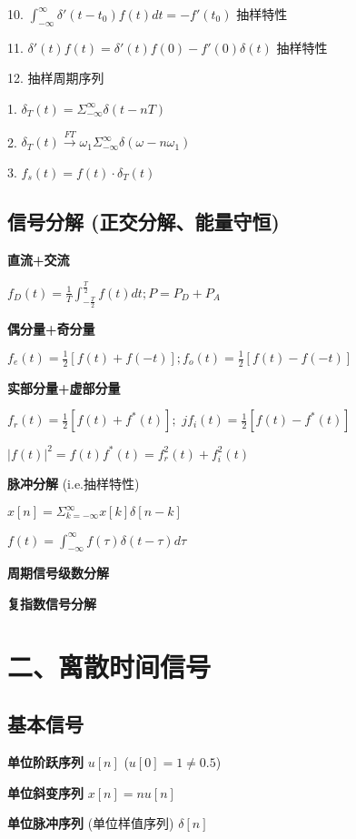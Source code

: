 10. $\int ^{\infty} _{-\infty} \delta' (t-t_0)f(t)dt = -f'(t_0)$ 抽样特性

11. $\delta '(t)f(t) = \delta'(t)f(0) - f'(0)\delta(t)$ 抽样特性

12. 抽样周期序列
    
    1. $\delta_T(t) = \Sigma ^{\infty} _ {-\infty} \delta(t - nT)$
    
    2. $\delta_T(t) \xrightarrow{FT} \omega_1\Sigma ^{\infty} _ {-\infty} \delta(\omega - n\omega _1)$
    
    3. $f_s(t) = f(t) \cdot \delta_T(t)$

\subsection*{信号分解 (正交分解、能量守恒)}

\textbf{直流+交流}

$f_D(t) = \frac{1}{T}\int ^{\frac{T}{2}} _{-\frac{T}{2}} f(t)dt ; P = P_D + P_A$

\textbf{偶分量+奇分量}

$f_e(t)=\frac{1}{2}[f(t)+f(-t)];f_o(t)=\frac{1}{2}[f(t)-f(-t)]$

\textbf{实部分量+虚部分量}

$f_r(t)=\frac{1}{2}[f(t)+f^*(t)];$   $jf_i(t)=\frac{1}{2}[f(t)-f^*(t)]$

$|f(t)|^2 = f(t)f^*(t)=f_r^2(t)+f_i^2(t)$

\textbf{脉冲分解} (i.e.抽样特性)

$x[n] = \Sigma ^{\infty} _{k=- \infty} x[k]\delta[n-k]$

$f(t) = \int ^{\infty} _{-\infty} f(\tau)\delta(t-\tau)d\tau$

\textbf{周期信号级数分解}

\textbf{复指数信号分解}

\section*{二、离散时间信号}

\subsection*{基本信号}

\textbf{单位阶跃序列} $u[n]$ ($u[0] = 1 \ne 0.5$)

\textbf{单位斜变序列} $x[n]=nu[n]$

\textbf{单位脉冲序列} (单位样值序列)  $\delta[n]$

